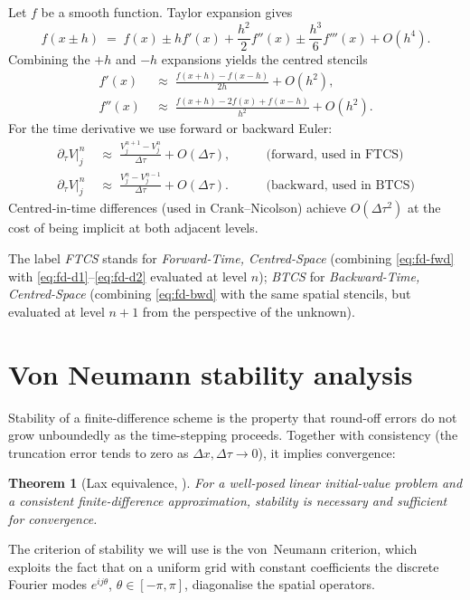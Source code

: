 \documentclass[11pt,a4paper]{article}
\newtheorem{theorem}[proposition]{Theorem}
\begin{document}
Let $f$ be a smooth function. Taylor expansion gives
\[
f(x \pm h) \;=\; f(x) \pm h f'(x) + \frac{h^2}{2} f''(x)
   \pm \frac{h^3}{6} f'''(x) + O(h^4).
\]
Combining the $+h$ and $-h$ expansions yields the centred stencils
\begin{align}
f'(x)  &\;\approx\; \frac{f(x+h) - f(x-h)}{2h} + O(h^2),
   \label{eq:fd-d1}\\
f''(x) &\;\approx\; \frac{f(x+h) - 2 f(x) + f(x-h)}{h^2} + O(h^2).
   \label{eq:fd-d2}
\end{align}
For the time derivative we use forward or backward Euler:
\begin{align}
\partial_\tau V|_j^n &\;\approx\;
   \frac{V_j^{n+1} - V_j^n}{\Delta \tau} + O(\Delta \tau),
   \qquad &\text{(forward, used in FTCS)}\label{eq:fd-fwd}\\
\partial_\tau V|_j^n &\;\approx\;
   \frac{V_j^n - V_j^{n-1}}{\Delta \tau} + O(\Delta \tau).
   \qquad &\text{(backward, used in BTCS)}\label{eq:fd-bwd}
\end{align}
Centred-in-time differences (used in Crank--Nicolson) achieve
$O(\Delta\tau^2)$ at the cost of being implicit at both adjacent
levels.

The label \emph{FTCS} stands for \emph{Forward-Time, Centred-Space}
(combining \eqref{eq:fd-fwd} with \eqref{eq:fd-d1}--\eqref{eq:fd-d2}
evaluated at level $n$); \emph{BTCS} for \emph{Backward-Time,
Centred-Space} (combining \eqref{eq:fd-bwd} with the same spatial
stencils, but evaluated at level $n+1$ from the perspective of the
unknown).

\section{Von Neumann stability analysis}\label{sec:vN}

Stability of a finite-difference scheme is the property that
round-off errors do not grow unboundedly as the time-stepping
proceeds. Together with consistency (the truncation error tends to
zero as $\Delta x, \Delta\tau \to 0$), it implies convergence:
\begin{theorem}[Lax equivalence,
{\cite{Strikwerda2004}}]
For a well-posed linear initial-value problem and a consistent
finite-difference approximation, stability is necessary and sufficient
for convergence.
\end{theorem}
The criterion of stability we will use is the von~Neumann criterion,
which exploits the fact that on a uniform grid with constant
coefficients the discrete Fourier modes $e^{ij\theta}$, $\theta \in
[-\pi, \pi]$, diagonalise the spatial operators.
\end{document}
